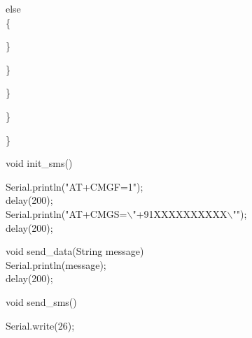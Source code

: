 else\\
\{\vspace{.3cm}


\} \vspace{.3cm}

\}\vspace{.3cm}

\}\vspace{.3cm}

\}\vspace{.3cm}

\}\vspace{.3cm}


void init\_sms()\\
{\vspace{.3cm}
	
	Serial.println("AT+CMGF=1");\\
	delay(200);\\
	Serial.println("AT+CMGS=$\backslash$"+91XXXXXXXXXX$\backslash$"");   \\
	delay(200);\\
}\vspace{.3cm}

void send\_data(String message)\\
{\vspace{.3cm}
	Serial.println(message);\\
	delay(200);\\
}\vspace{.3cm}

void send\_sms()\\
{\vspace{.3cm}
	
	Serial.write(26);\\
}\vspace{.3cm}
